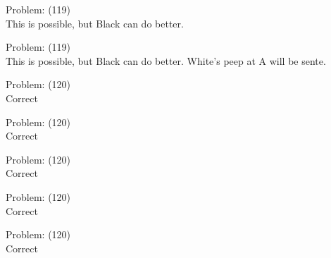 \documentclass[11pt]{article}
\begin{document}
\begin{minipage}[t]{0.5\textwidth}
  {\centering
  
Problem: (119)\\
This is possible, but Black can do better.\\
  }
\end{minipage}
\begin{minipage}[t]{0.5\textwidth}
  {\centering
  
Problem: (119)\\
This is possible, but Black can do better. White's peep at A will be sente.\\
  }
\end{minipage}
\begin{minipage}[t]{0.5\textwidth}
  {\centering
  
Problem: (120)\\
Correct\\
  }
\end{minipage}
\begin{minipage}[t]{0.5\textwidth}
  {\centering
  
Problem: (120)\\
Correct\\
  }
\end{minipage}
\begin{minipage}[t]{0.5\textwidth}
  {\centering
  
Problem: (120)\\
Correct\\
  }
\end{minipage}
\begin{minipage}[t]{0.5\textwidth}
  {\centering
  
Problem: (120)\\
Correct\\
  }
\end{minipage}
\begin{minipage}[t]{0.5\textwidth}
  {\centering
  
Problem: (120)\\
Correct\\
  }
\end{minipage}
\end{document}
